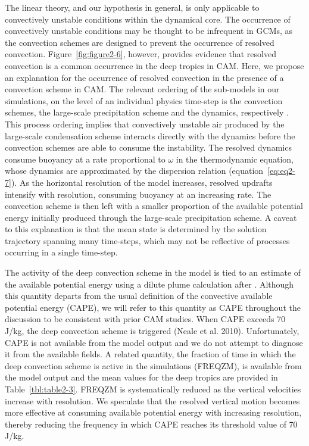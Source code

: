 The linear theory, and our hypothesis in general, is only applicable to convectively unstable conditions within the dynamical core. The occurrence of convectively unstable conditions may be thought to be infrequent in GCMs, as the convection schemes are designed to prevent the occurrence of resolved convection. Figure~\ref{fig:figure2-6}, however, provides evidence that resolved convection is a common occurrence in the deep tropics in CAM. Here, we propose an explanation for the occurrence of resolved convection in the presence of a convection scheme in CAM. The relevant ordering of the sub-models in our simulations, on the level of an individual physics time-step is the convection schemes, the large-scale precipitation scheme and the dynamics, respectively \citep{CAM4}. This process ordering implies that convectively unstable air produced by the large-scale condensation scheme interacts directly with the dynamics before the convection schemes are able to consume the instability. The resolved dynamics consume buoyancy at a rate proportional to $\omega$ in the thermodynamic equation, whose dynamics are approximated by the dispersion relation (equation~\ref{eq:eq2-7}). As the horizontal resolution of the model increases, resolved updrafts intensify with resolution, consuming buoyancy at an increasing rate. The convection scheme is then left with a smaller proportion of the available potential energy initially produced through the large-scale precipitation scheme. A caveat to this explanation is that the mean state is determined by the solution trajectory spanning many time-steps, which may not be reflective of processes occurring in a single time-step.

The activity of the deep convection scheme in the model is tied to an estimate of the available potential energy using a dilute plume calculation after \cite{RB1992JAS}. Although this quantity departs from the usual definition of the convective available potential energy (CAPE), we will refer to this quantity as CAPE throughout the discussion to be consistent with prior CAM studies. When CAPE exceeds 70 J/kg, the deep convection scheme is triggered (Neale et al. 2010). Unfortunately, CAPE is not available from the model output and we do not attempt to diagnose it from the available fields. A related quantity, the fraction of time in which the deep convection scheme is active in the simulations (FREQZM), is available from the model output and the mean values for the deep tropics are provided in Table~\ref{tbl:table2-3}. FREQZM is systematically reduced as the vertical velocities increase with resolution. We speculate that the resolved vertical motion becomes more effective at consuming available potential energy with increasing resolution, thereby reducing the frequency in which CAPE reaches its threshold value of 70 J/kg.

